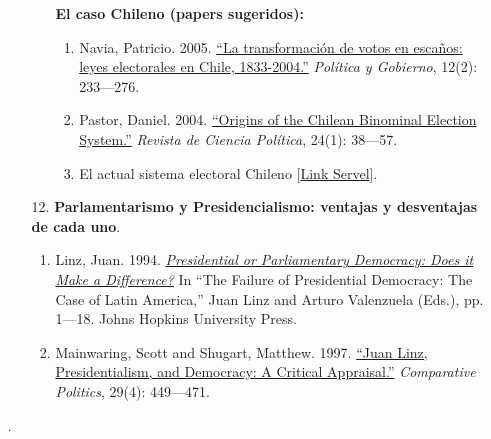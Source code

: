 \documentclass[letterpaper]{article}
\begin{document}
\begin{enumerate}
\begin{enumerate}
\begin{enumerate}
						\item[{\Pointinghand}] {\bf El caso Chileno (papers sugeridos):}
									\begin{enumerate}
										\item Navia, Patricio. 2005. \href{https://github.com/hbahamonde/Ciencia_Politica_I/raw/master/Readings/Navia_2005.pdf}{``La transformaci\'on de votos en esca\~nos: leyes electorales en Chile, 1833-2004.''} \emph{Pol\'itica y Gobierno}, 12(2): 233---276.
										\item Pastor, Daniel. 2004. \href{https://github.com/hbahamonde/Ciencia_Politica_I/raw/master/Readings/Pastor_2004.pdf}{``Origins of the Chilean Binominal Election System.''} \emph{Revista de Ciencia Pol\'itica}, 24(1): 38---57.
										\item El actual sistema electoral Chileno [\href{https://www.servel.cl/nuevo-sistema-electoral-chileno-metodo-dhont-2/}{Link Servel}].
									\end{enumerate}
					\end{enumerate}

				
				\item[12.] {\bf Parlamentarismo y Presidencialismo: ventajas y desventajas de cada uno}.
					\begin{enumerate}
						\item Linz, Juan. 1994. \href{https://github.com/hbahamonde/Ciencia_Politica_I/raw/master/Readings/Linz.pdf}{\emph{Presidential or Parliamentary Democracy: Does it Make a Difference?}} In ``The Failure of Presidential Democracy: The Case of Latin America,'' Juan Linz and Arturo Valenzuela (Eds.), pp. 1---18. Johns Hopkins University Press.%
						
						\item Mainwaring, Scott and Shugart, Matthew. 1997. \href{https://github.com/hbahamonde/Ciencia_Politica_I/raw/master/Readings/Mainwaring_Shugart.pdf}{``Juan Linz, Presidentialism, and Democracy: A Critical Appraisal.''} \emph{Comparative Politics}, 29(4): 449---471.%
					\end{enumerate}
				\end{enumerate}




{\huge{\color{blue}\Pointinghand}} {\large{\color{red}{\bf Midterm para la casa. Entra todo lo visto hasta el momento}.}}


\end{enumerate}
\end{document}
